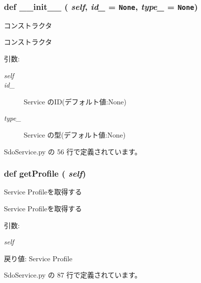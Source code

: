 \subsubsection{\setlength{\rightskip}{0pt plus 5cm}def \_\-\_\-init\_\-\_\- ( {\em self},  {\em id\_\-} = {\tt None},  {\em type\_\-} = {\tt None})}\label{classsource__py_1_1_sdo_service_1_1_s_d_o_service_profile_c775ee34451fdfa742b318538164070e}


コンストラクタ 

コンストラクタ

\begin{Desc}
\item[引数:]
\begin{description}
\item[{\em self}]\item[{\em id\_\-}]Service のID(デフォルト値:None) \item[{\em type\_\-}]Service の型(デフォルト値:None) \end{description}
\end{Desc}


 SdoService.py の 56 行で定義されています。
\subsubsection{\setlength{\rightskip}{0pt plus 5cm}def getProfile ( {\em self})}\label{classsource__py_1_1_sdo_service_1_1_s_d_o_service_profile_acad679051aaced1eb09f969965dcfa0}


Service Profileを取得する 

Service Profileを取得する

\begin{Desc}
\item[引数:]
\begin{description}
\item[{\em self}]\end{description}
\end{Desc}
\begin{Desc}
\item[戻り値:]Service Profile \end{Desc}


 SdoService.py の 87 行で定義されています。
